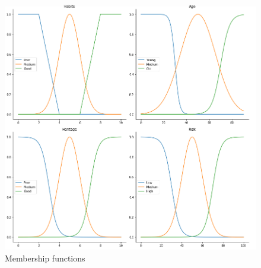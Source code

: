\documentclass[conference]{IEEEtran}
\begin{document}
\begin{figure}[t!]
    \centering
    \includegraphics[scale = 0.6]{figures/mem.PNG}
    \caption{Membership functions}
    \label{fig:mem}
\end{figure}
\end{document}
